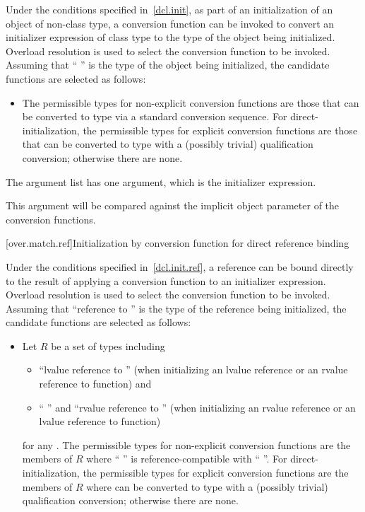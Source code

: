 \pnum
Under the conditions specified in~\ref{dcl.init}, as
part of an initialization of an object of non-class type,
a conversion function can be invoked to convert an initializer
expression of class type to the type of the object
being initialized.
Overload resolution is used to select the
conversion function to be invoked.
Assuming that ``\cv{} '' is the
type of the object being initialized,
the candidate functions are selected as follows:
\begin{itemize}
\item
The permissible types for non-explicit conversion functions are
those that can be converted to type 
via a standard conversion sequence.
For direct-initialization,
the permissible types for explicit conversion functions are
those that can be converted to type 
with a (possibly trivial) qualification conversion;
otherwise there are none.
\end{itemize}

\pnum
The argument list has one argument, which is the initializer expression.
\begin{note}
This argument will be compared against
the implicit object parameter of the conversion functions.
\end{note}

[over.match.ref]{Initialization by conversion function for direct reference binding}%

\pnum
Under the conditions specified in~\ref{dcl.init.ref}, a reference can be bound directly
to the result of applying a conversion
function to an initializer expression.
Overload resolution is used to select the
conversion function to be invoked.
Assuming that ``reference to  '' is the
type of the reference being initialized,
the candidate functions are selected as follows:
\begin{itemize}
\item
Let $R$ be a set of types including
\begin{itemize}
\item
``lvalue reference to  ''
(when initializing an lvalue reference or an rvalue reference to function) and
\item
`` ''
and ``rvalue reference to  '' (when initializing an
rvalue reference or an lvalue reference to function)
\end{itemize}
for any .
The permissible types for non-explicit conversion functions are
the members of $R$
where `` '' is reference-compatible
with `` ''.
For direct-initialization, the permissible types for explicit
conversion functions are the members of $R$
where  can be converted to type 
with a (possibly trivial) qualification conversion;
otherwise there are none.
\end{itemize}

